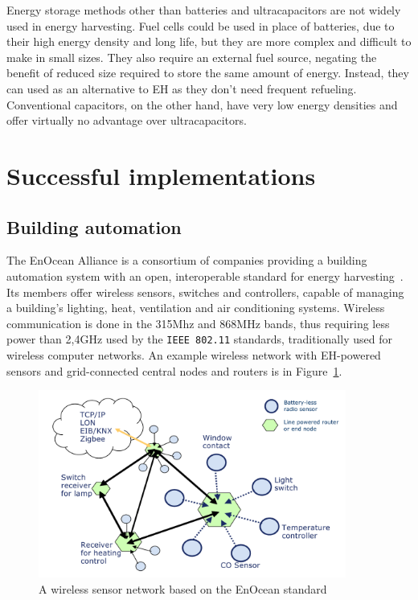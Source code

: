 \documentclass[a4paper,10pt]{article}
\begin{document}
Energy storage methods other than batteries and ultracapacitors are not widely used in energy harvesting. Fuel cells could be used in place of batteries, due to their high energy density and long life, but they are more complex and difficult to make in small sizes. They also require an external fuel source, negating the benefit of reduced size required to store the same amount of energy. Instead, they can used as an alternative to \ac{EH} as they don't need frequent refueling. Conventional capacitors, on the other hand, have very low energy densities and offer virtually no advantage over ultracapacitors. 

\section{Successful implementations}

\subsection{Building automation}

The EnOcean Alliance is a consortium of companies providing a building automation system with an open, interoperable standard for energy harvesting~\cite{enocean}. Its members offer wireless sensors, switches and controllers, capable of managing a building's lighting, heat, ventilation and air conditioning systems. Wireless communication is done in the 315Mhz and 868MHz bands, thus requiring less power than 2,4GHz used by the \texttt{IEEE 802.11} standards, traditionally used for wireless computer networks. An example wireless network with \ac{EH}-powered sensors and grid-connected central nodes and routers is in Figure~\ref{fig:enocean-shema}. 

\begin{figure}[h]
\centering
 \includegraphics[width=0.9\textwidth]{./Slike/EnOcean-shema}
\caption{A wireless sensor network based on the EnOcean standard~\cite{enocean}}
\label{fig:enocean-shema}
\end{figure}
\end{document}

